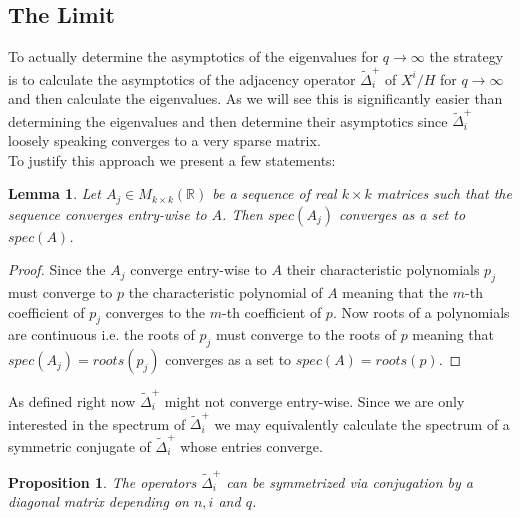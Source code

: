 \documentclass[11pt]{amsart}
\newtheorem{proposition}[theorem]{Proposition}
\newtheorem{lemma}[theorem]{Lemma}
\begin{document}
    \subsection{The Limit}
    \label{sec:TheLimit}
    To actually determine the asymptotics of the eigenvalues for $q\rightarrow\infty$ the strategy is to calculate the asymptotics of the adjacency operator $\tilde{\Delta}_i^+$ of $X^i/H$ for $q\rightarrow\infty$ and then calculate the eigenvalues. As we will see this is significantly easier than determining the eigenvalues and then determine their asymptotics since $\tilde{\Delta}_i^+$ loosely speaking converges to a very sparse matrix.\\
    To justify this approach we present a few statements:
    \begin{lemma}
        Let $A_j\in M_{k\times k}(\mathbb{R})$ be a sequence of real $k\times k$ matrices such that the sequence converges entry-wise to $A$. Then $spec(A_j)$ converges as a set to $spec(A)$.
        \label{lem:SpectralConvergence}
    \end{lemma}
    \begin{proof}
        Since the $A_j$ converge entry-wise to $A$ their characteristic polynomials $p_j$ must converge to $p$ the characteristic polynomial of $A$ meaning that the $m$-th coefficient of $p_j$ converges to the $m$-th coefficient of $p$. Now roots of a polynomials are continuous i.e. the roots of $p_j$ must converge to the roots of $p$ meaning that $spec(A_j)=roots(p_j)$ converges as a set to $spec(A)=roots(p)$.
    \end{proof}
    As defined right now $\tilde{\Delta}_i^+$ might not converge entry-wise. Since we are only interested in the spectrum of $\tilde{\Delta}_i^+$ we may equivalently calculate the spectrum of a symmetric conjugate of $\tilde{\Delta}_i^+$ whose entries converge.
    \begin{proposition}
        The operators $\tilde{\Delta}_i^+$ can be symmetrized via conjugation by a diagonal matrix depending on $n,i$ and $q$. 
        \label{prop:SymMatrix}
    \end{proposition}
\end{document}
